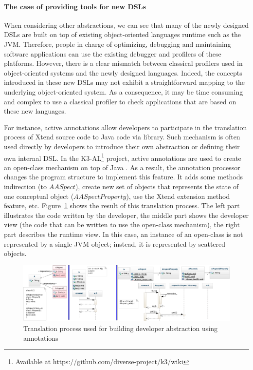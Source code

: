 \paragraph{The case of providing tools for new DSLs}
When considering other abstractions, we can see that many of the newly designed DSLs are built on top of existing object-oriented languages runtime such as the JVM. 
Therefore, people in charge of optimizing, debugging and maintaining software applications can use the existing debugger and profilers of these platforms. 
However, there is a clear mismatch between classical profilers used in object-oriented systems and the newly designed languages. 
Indeed, the concepts introduced in these new DSLs may not exhibit a straightforward mapping to the underlying object-oriented system.
As a consequence, it may be time consuming and complex to use a classical profiler to check applications that are based on these new languages.

For instance, active annotations allow developers to participate in the translation process of Xtend source code to Java code via library.
Such mechanism is often used directly by developers to introduce their own abstraction or defining their own internal DSL.
In the K3-AL\footnote{Available at https://github.com/diverse-project/k3/wiki} project, active annotations are used to create an open-class mechanism on top of Java \cite{Clifton:2000:MMO:353171.353181}. 
As a result, the annotation processor changes the program structure to implement this feature. 
It adds some methods indirection (to $AASpect$), create new set of objects that represents the state of one conceptual object ($AASpectProperty$), use the Xtend extension method feature, etc.
Figure~\ref{fig:k3-diagram} shows the result of this translation process. 
The left part illustrates the code written by the developer, the middle part shows the developer view (the code that can be written to use the open-class mechanism), the right part describes the runtime view.
In this case, an instance of an open-class is not represented by a single JVM object; instead, it is represented by scattered objects.  

\begin{figure}
\centering
\includegraphics[width=0.9\linewidth]{chapter2/fig/famous}
\caption{Translation process used for building developer abstraction using annotations}
\label{fig:k3-diagram}
\end{figure}

